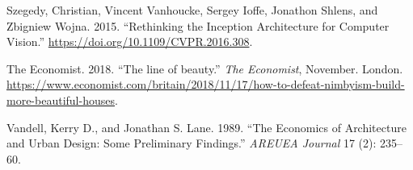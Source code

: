 \documentclass[]{article}
\begin{document}
\leavevmode\hypertarget{ref-Szegedy2015}{}%
Szegedy, Christian, Vincent Vanhoucke, Sergey Ioffe, Jonathon Shlens,
and Zbigniew Wojna. 2015. ``Rethinking the Inception Architecture for
Computer Vision.'' \url{https://doi.org/10.1109/CVPR.2016.308}.

\leavevmode\hypertarget{ref-economistlineofbeauty2018}{}%
The Economist. 2018. ``The line of beauty.'' \emph{The Economist},
November. London.
\url{https://www.economist.com/britain/2018/11/17/how-to-defeat-nimbyism-build-more-beautiful-houses}.

\leavevmode\hypertarget{ref-Vandell1989}{}%
Vandell, Kerry D., and Jonathan S. Lane. 1989. ``The Economics of
Architecture and Urban Design: Some Preliminary Findings.'' \emph{AREUEA
Journal} 17 (2): 235--60.
\end{document}
